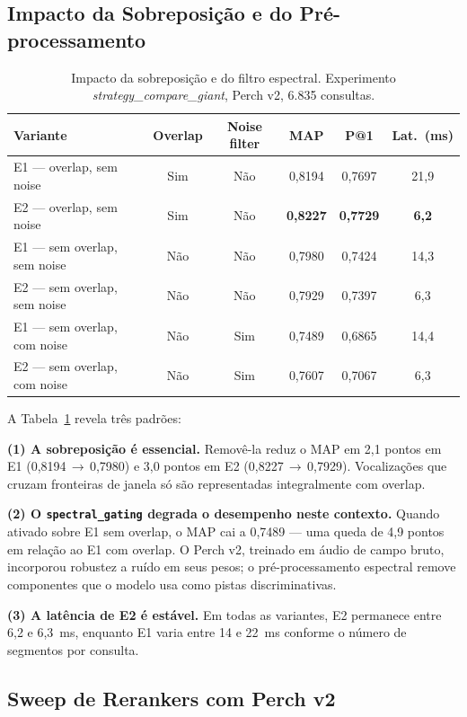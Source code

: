 \documentclass[12pt]{article}
\begin{document}
\subsection{Impacto da Sobreposição e do Pré-processamento}

\begin{table}[H]
\centering
\caption{Impacto da sobreposição e do filtro espectral. Experimento
\textit{strategy\_compare\_giant}, Perch v2, 6.835 consultas.}
\label{tab:giant}
\begin{tabular}{lccccc}
\toprule
\textbf{Variante} & \textbf{Overlap} & \textbf{Noise filter} & \textbf{MAP} & \textbf{P@1} & \textbf{Lat.\ (ms)} \\
\midrule
E1 --- overlap, sem noise    & Sim & Não & 0,8194 & 0,7697 & 21,9 \\
E2 --- overlap, sem noise    & Sim & Não & \textbf{0,8227} & \textbf{0,7729} & \textbf{6,2} \\
E1 --- sem overlap, sem noise & Não & Não & 0,7980 & 0,7424 & 14,3 \\
E2 --- sem overlap, sem noise & Não & Não & 0,7929 & 0,7397 & 6,3 \\
E1 --- sem overlap, com noise & Não & Sim & 0,7489 & 0,6865 & 14,4 \\
E2 --- sem overlap, com noise & Não & Sim & 0,7607 & 0,7067 & 6,3 \\
\bottomrule
\end{tabular}
\end{table}

A Tabela~\ref{tab:giant} revela três padrões:

\textbf{(1) A sobreposição é essencial.} Removê-la reduz o MAP em 2,1 pontos
em E1 (0,8194\,$\to$\,0,7980) e 3,0 pontos em E2 (0,8227\,$\to$\,0,7929).
Vocalizações que cruzam fronteiras de janela só são representadas integralmente
com overlap.

\textbf{(2) O \texttt{spectral\_gating} degrada o desempenho neste contexto.}
Quando ativado sobre E1 sem overlap, o MAP cai a 0,7489 --- uma queda de 4,9
pontos em relação ao E1 com overlap. O Perch v2, treinado em áudio de campo
bruto, incorporou robustez a ruído em seus pesos; o pré-processamento espectral
remove componentes que o modelo usa como pistas discriminativas.

\textbf{(3) A latência de E2 é estável.} Em todas as variantes, E2 permanece
entre 6,2 e 6,3~ms, enquanto E1 varia entre 14 e 22~ms conforme o número de
segmentos por consulta.

\subsection{Sweep de Rerankers com Perch v2}
\end{document}
